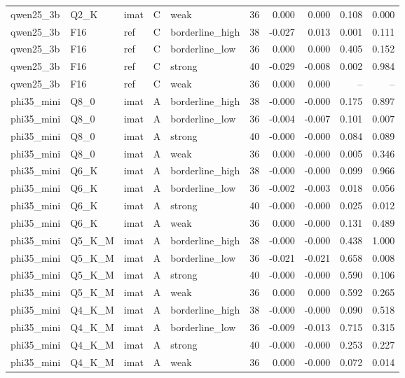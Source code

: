 \begin{tabular}{lllllrrrrr}
qwen25\_3b & Q2\_K & imat & C & weak & 36 & 0.000 & 0.000 & 0.108 & 0.000 \\
qwen25\_3b & F16 & ref & C & borderline\_high & 38 & -0.027 & 0.013 & 0.001 & 0.111 \\
qwen25\_3b & F16 & ref & C & borderline\_low & 36 & 0.000 & 0.000 & 0.405 & 0.152 \\
qwen25\_3b & F16 & ref & C & strong & 40 & -0.029 & -0.008 & 0.002 & 0.984 \\
qwen25\_3b & F16 & ref & C & weak & 36 & 0.000 & 0.000 & -- & -- \\
phi35\_mini & Q8\_0 & imat & A & borderline\_high & 38 & -0.000 & -0.000 & 0.175 & 0.897 \\
phi35\_mini & Q8\_0 & imat & A & borderline\_low & 36 & -0.004 & -0.007 & 0.101 & 0.007 \\
phi35\_mini & Q8\_0 & imat & A & strong & 40 & -0.000 & -0.000 & 0.084 & 0.089 \\
phi35\_mini & Q8\_0 & imat & A & weak & 36 & 0.000 & -0.000 & 0.005 & 0.346 \\
phi35\_mini & Q6\_K & imat & A & borderline\_high & 38 & -0.000 & -0.000 & 0.099 & 0.966 \\
phi35\_mini & Q6\_K & imat & A & borderline\_low & 36 & -0.002 & -0.003 & 0.018 & 0.056 \\
phi35\_mini & Q6\_K & imat & A & strong & 40 & -0.000 & -0.000 & 0.025 & 0.012 \\
phi35\_mini & Q6\_K & imat & A & weak & 36 & 0.000 & -0.000 & 0.131 & 0.489 \\
phi35\_mini & Q5\_K\_M & imat & A & borderline\_high & 38 & -0.000 & -0.000 & 0.438 & 1.000 \\
phi35\_mini & Q5\_K\_M & imat & A & borderline\_low & 36 & -0.021 & -0.021 & 0.658 & 0.008 \\
phi35\_mini & Q5\_K\_M & imat & A & strong & 40 & -0.000 & -0.000 & 0.590 & 0.106 \\
phi35\_mini & Q5\_K\_M & imat & A & weak & 36 & 0.000 & 0.000 & 0.592 & 0.265 \\
phi35\_mini & Q4\_K\_M & imat & A & borderline\_high & 38 & -0.000 & -0.000 & 0.090 & 0.518 \\
phi35\_mini & Q4\_K\_M & imat & A & borderline\_low & 36 & -0.009 & -0.013 & 0.715 & 0.315 \\
phi35\_mini & Q4\_K\_M & imat & A & strong & 40 & -0.000 & -0.000 & 0.253 & 0.227 \\
phi35\_mini & Q4\_K\_M & imat & A & weak & 36 & 0.000 & -0.000 & 0.072 & 0.014 \\

\end{tabular}
